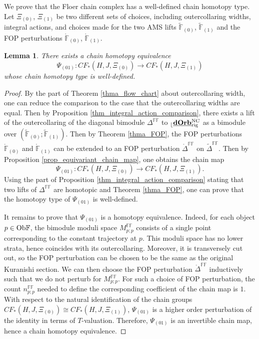 \documentclass[reqno, 10pt]{amsart}
\numberwithin{equation}{section}
\numberwithin{equation}{section}
\newtheorem{lemma}[thm]{Lemma}
\theoremstyle{definition}
\theoremstyle{remark}
\newcommand{\beqn}{\begin{equation*}}
\newcommand{\eeqn}{\end{equation*}}
\newcommand{\mb}{\mathbb}
\renewcommand{\outer}{{}_{\lfloor}}
\newcommand{\uds}[1]{\underline{\smash{#1}}}
\begin{document}
We prove that the Floer chain complex has a well-defined chain homotopy type. Let $\Xi_{(0)}$, $\Xi_{(1)}$ be two different sets of choices, including outercollaring widths, integral actions, and choices made for the two AMS lifts $\tilde {\mb F}_{(0)}$, $\tilde {\mb F}_{(1)}$ and the FOP perturbations $\mathring {\mb F}_{(0)}$, $\mathring {\mb F}_{(1)}$. 

\begin{lemma}\label{lemma131}
There exists a chain homotopy equivalence 
\beqn
\Psi_{(01)}: CF_*(H, J, \Xi_{(0)}) \to CF_*(H, J, \Xi_{(1)})
\eeqn
whose chain homotopy type is well-defined.
\end{lemma}

\begin{proof}
By the part of Theorem \ref{thma_flow_chart} about outercollaring width, one can reduce the comparison to the case that the outercollaring widths are equal. Then by Proposition \ref{thm_integral_action_comparison}, there exists a lift of the outercollaring of the diagonal bimodule $\mb{\Delta}^{\mb{FF}}$ to $\outer \uds{\bf dOrb}_{\rm rig}^{\rm NC}$ as a bimodule over $(\tilde{\mb F}_{(0)}; \tilde {\mb F}_{(1)})$. Then by Theorem \ref{thma_FOP}, the FOP perturbations $\mathring {\mb F}_{(0)}$ and $\mathring {\mb F}_{(1)}$ can be extended to an FOP perturbation $\mathring{\mb{\Delta}}^{\mb{FF}}$ on $\tilde{\mb{\Delta}}^{\mb{FF}}$. Then by Proposition \ref{prop_equivariant_chain_map}, one obtains the chain map
\beqn
\Psi_{(01)}: CF_*(H, J, \Xi_{(0)}) \to CF_*(H, J, \Xi_{(1)}).
\eeqn
Using the part of Proposition \ref{thm_integral_action_comparison} stating that two lifts of ${\mb \Delta}^{\mb{FF}}$ are homotopic and Theorem \ref{thma_FOP}, one can prove that the homotopy type of $\Psi_{(01)}$ is well-defined.

It remains to prove that $\Psi_{(01)}$ is a homotopy equivalence. Indeed, for each object $p \in {\rm Ob}{\mb F}$, the bimodule moduli space $M_{p;p}^{\mb{FF}}$ consists of a single point corresponding to the constant trajectory at $p$. This moduli space has no lower strata, hence coincides with its outercollaring. Moreover, it is transversely cut out, so the FOP perturbation can be chosen to be the same as the original Kuranishi section. We can then choose the FOP perturbation $\mathring{\mb{\Delta}}^{\mb{FF}}$ inductively such that we do not perturb for $M_{p;p}^{\mb{FF}}$. For such a choice of FOP perturbation, the count $n_{p;p}^{\mb{FF}}$ needed to define the corresponding coefficient of the chain map is $1$. With respect to the natural identification of the chain groups $CF_*(H, J, \Xi_{(0)}) \cong CF_*(H, J, \Xi_{(1)})$, $\Psi_{(01)}$ is a higher order perturbation of the identity in terms of $T$-valuation. Therefore, $\Psi_{(01)}$ is an invertible chain map, hence a chain homotopy equivalence. 
\end{proof}
\end{document}
